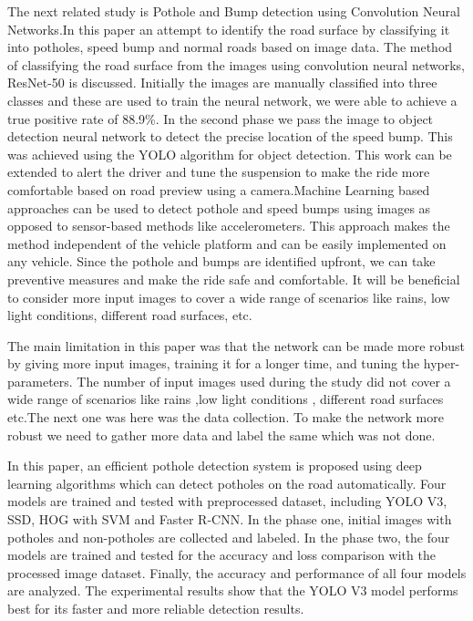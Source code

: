 \noindent
The next related study is Pothole and Bump detection using Convolution Neural Networks.In this paper an attempt to identify the road surface by classifying it into potholes, speed bump and normal roads based on image data\cite{R8}. The method of classifying the road surface from the images using convolution neural networks, ResNet-50 is discussed. Initially the images are manually classified into three classes and these are used to train the neural network, we were able to achieve a true positive rate of 88.9\%. In the second phase we pass the image to object detection neural network to detect the precise location of the speed bump. This was achieved using the YOLO algorithm for object detection. This work can be extended to alert the driver and tune the suspension to make the ride more comfortable based on road preview using a camera.Machine Learning based approaches can be used to detect pothole and speed bumps using images as opposed to sensor-based methods like accelerometers. This approach makes the method independent of the vehicle platform and can be easily implemented on any vehicle. Since the pothole and bumps are identified upfront, we can take preventive measures and make the ride safe and comfortable. It will be beneficial to consider more input images to cover a wide range of scenarios like rains, low light conditions, different road surfaces, etc. 

\noindent
The main limitation in this paper was that the
network can be made more robust by giving more input images,
training it for a longer time, and tuning the hyper-parameters. The number of input images used during the study did not cover a wide range of scenarios like rains ,low light conditions , different road surfaces etc.The next one was here was the data collection. To make the network more robust we need to gather more data and label the same which was not done.


\noindent
 In this paper,  an efficient pothole detection system is proposed using deep learning algorithms which can detect potholes on the road automatically\cite{R15}. Four models are trained and tested with preprocessed dataset, including YOLO V3, SSD, HOG with SVM and Faster R-CNN. In the phase one, initial images with potholes and non-potholes are collected and labeled. In the phase two, the four models are trained and tested for the accuracy and loss comparison with the processed image dataset. Finally, the accuracy and performance of all four models are analyzed. The experimental results show that the YOLO V3 model performs best for its faster and more reliable detection results. 

